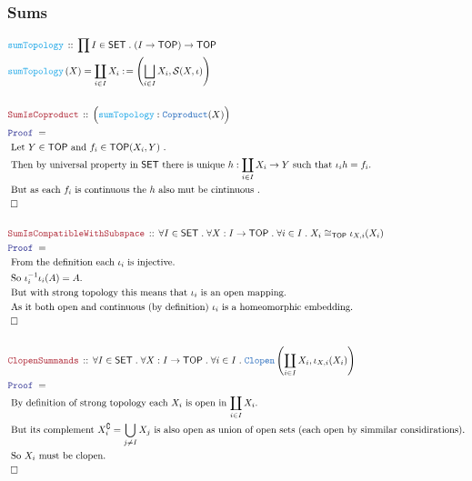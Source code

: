\documentclass[12pt]{scrartcl}
\newcommand{\TYPE}[1]{\textcolor{NavyBlue}{\mathtt{#1}}}
\newcommand{\FUNC}[1]{\textcolor{Cerulean}{\mathtt{#1}}}
\newcommand{\LOGIC}[1]{\textcolor{Blue}{\mathtt{#1}}}
\newcommand{\THM}[1]{\textcolor{Maroon}{\mathtt{#1}}}
\renewcommand{\.}{\; . \;}
\newcommand{\de}{: \kern 0.1pc =}
\newcommand{\Act}[1]{\left( #1 \right)}
\newcommand{\Theorem}[2]{& \THM{#1} \, :: \, #2 \\ & \Proof = \\ }
\newcommand{\DeclareFunc}[2]{& \FUNC{#1} \, :: \, #2 \\}
\newcommand{\DefineNamedFunc}[4]{&  \FUNC{#1}\Act{#2} = #3 \de #4 \\}
\newcommand{\Page}[1]{ \begin{align*} #1 \end{align*}   }
\newcommand{\Explain}[1]{& \text{#1.} \\}
\renewcommand{\c}{\complement}
\newcommand{\QED}{\; \square}
\newcommand{\EndProof}{& \QED \\}
\newcommand{\Proof}{\LOGIC{Proof} \; }
\newcommand{\SET}{\mathsf{SET}}
\newcommand{\TOP}{\mathsf{TOP}}
\renewcommand{\S}{\mathcal{S}}
\begin{document}
\subsubsection{Sums}
\Page{
	\DeclareFunc{sumTopology}
	{
		\prod I \in \SET \. 
		( I \to \TOP) \to \TOP 
	}
	\DefineNamedFunc{sumTopology}{X}{\coprod_{i \in I} X_i}
	{
		\left( \bigsqcup_{i \in I} X_i,
			\S(X,\iota)		
		\right)
	} 
	\\
	\Theorem{SumIsCoproduct}{\Big(\FUNC{sumTopology} : \TYPE{Coproduct}(X)\Big)}
	\Explain{ 
		Let $Y\in \TOP$ and $f_i \in \TOP(X_i,Y)$ }
	\Explain{
		Then by universal property in $\SET$ 
		there is unique $h : \coprod_{i \in I} X_i \to Y$
		such that $\iota_i h = f_i$}
	\Explain{
		But as each $f_i$ is continuous the $h$ also mut be cintinuous
	}
	\EndProof
	\\
	\Theorem{SumIsCompatibleWithSubspace}
	{
		\forall I \in \SET \.
		\forall X : I \to \TOP \.
		\forall i \in I \. 
		X_i \cong_{\TOP} \iota_{X,i}(X_i)
	}
	\Explain{ 
		From the definition each $\iota_i$ is injective}
	\Explain{
		So $\iota^{-1}_i \iota_i(A) = A$}
	\Explain{
		But with strong topology this means that $\iota_i$ is an open mapping}
	\Explain{
		As it both open and continuous (by definition) $\iota_i$ is a homeomorphic
		embedding}
	\EndProof
	\\
	\Theorem{ClopenSummands}
	{
		\forall I \in \SET \.
		\forall X : I \to \TOP \.
		\forall i \in I \.
		\TYPE{Clopen}\left( \coprod_{i \in I}  X_i, \iota_{X,i}(X_i) \right) 
	}
	\Explain{ By definition of strong topology each $X_i$ is open in $\coprod_{i \in I} X_i$}
	\Explain{
		But its complement $X_i^\c = \bigcup_{j \neq I} X_j$ is also open as union
		of open sets (each open by simmilar considirations)}
	\Explain{
		So $X_i$ must be clopen}
	\EndProof
}
\newpage
\end{document}
